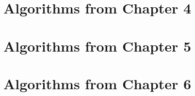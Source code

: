 \label{app:alg}



\chapter{Algorithms from Chapter 4}


\chapter{Algorithms from Chapter 5}


\chapter{Algorithms from Chapter 6}


